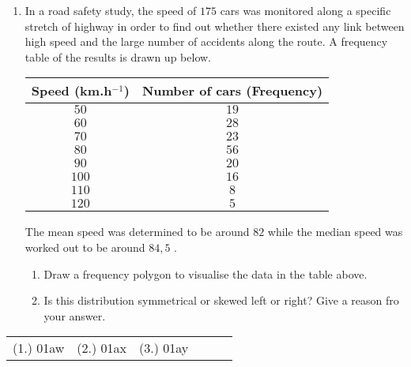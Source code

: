 {\begin{enumerate}
\item In a road safety study, the speed of $175$ cars was monitored along a specific stretch of highway in order to find out whether there existed any link between high speed and the large number of accidents along the route. A frequency table of the results is drawn up below.
\begin{center}
\begin{tabular}{|c|c|}\hline
\textbf{Speed (km.h$^{-1}$)} & \textbf{Number of cars (Frequency)} \\\hline
 $50$ & $19$ \\\hline
 $60$ & $28$ \\\hline
 $70$ & $23$ \\\hline
 $80$ & $56$ \\\hline
 $90$ & $20$ \\\hline
 $100$ & $16$ \\\hline
 $110$ & $8$ \\\hline
 $120$ & $5$ \\\hline
\end{tabular}
\end{center}
The mean speed was determined to be around $82$ \kph while the median speed was worked out to be around $84,5$ \kph.
\begin{enumerate}
\item Draw a frequency polygon to visualise the data in the table above.
\item Is this distribution symmetrical or skewed left or right? Give a reason fro your answer.
\end{enumerate}

\end{enumerate}

\par \practiceinfo
\par \begin{tabular}[h]{cccccc}
(1.)	01aw	&
(2.)	01ax	&
(3.)	01ay	&
\end{tabular}}

